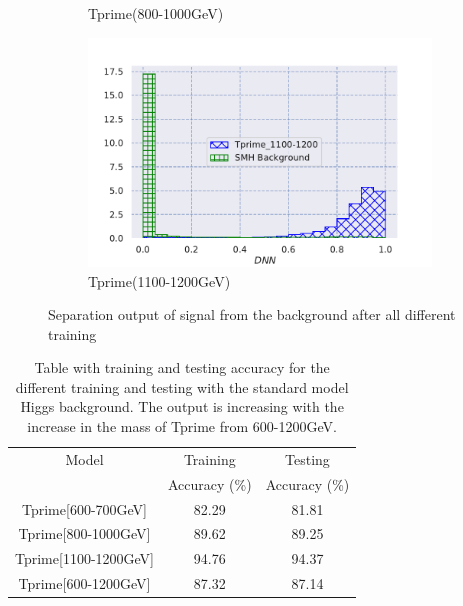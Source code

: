 \begin{figure}[H]
\begin{subfigure}[b]{0.47\textwidth}
         \caption{Tprime(800-1000GeV)}
         \label{fig:three sin x}
     \end{subfigure}
     \hfill
     \begin{subfigure}[b]{0.47\textwidth}
         \centering
         \includegraphics[width=\textwidth]{figure_4/Training_with_Tprime_1100-1200GeV_ with_backgrounds.pdf}
         \caption{Tprime(1100-1200GeV)}
         \label{fig:five over x}
     \end{subfigure}
        \caption{Separation output of signal from the background after all different training }
        \label{fig:three graphs}
\end{figure}








\begin{table}[H]
    \centering
    \begin{tabular}{|c|c|c|}\hline
    Model     & Training   & Testing  \\
              & Accuracy (\%)  &     Accuracy (\%)  \\\hline
   Tprime[600-700GeV]       &     82.29        &    81.81         \\
   Tprime[800-1000GeV]          &   89.62          &     89.25        \\
   Tprime[1100-1200GeV]          &     94.76        &    94.37         \\
   Tprime[600-1200GeV]          &       87.32      &        87.14     \\\hline
    \end{tabular}
    \caption{Table with training and testing accuracy for the different training and testing with the standard model Higgs background. The output is increasing with the increase in the mass of Tprime from 600-1200GeV.}
    \label{tab:my_label_table_1}
\end{table}




